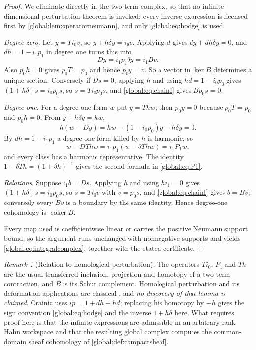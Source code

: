 \documentclass[11pt,letterpaper]{article}
\theoremstyle{definition}
\theoremstyle{remark}
\newtheorem{remark}[remark]{Remark}
\newcommand{\coker}{\operatorname{coker}}
\numberwithin{equation}{section}
\begin{document}
\begin{proof}
We eliminate directly in the two-term complex, so that no infinite-dimensional perturbation theorem is invoked; every inverse expression is licensed first by \cref{global:lem:operatorneumann}, and only \eqref{global:eq:hodge} is used.

\emph{Degree zero.} Let $y=Ti_0v$, so $y+h\delta y=i_0v$. Applying $d$ gives $dy+dh\delta y=0$, and $dh=1-i_1p_1$ in degree one turns this into
\begin{equation}\label{global:eq:chainI}
  Dy=i_1p_1\delta y=i_1Bv .
\end{equation}
Also $p_0h=0$ gives $p_0T=p_0$ and hence $p_0y=v$. So a vector in $\ker B$ determines a unique section. Conversely if $Ds=0$, applying $h$ and using $hd=1-i_0p_0$ gives $(1+h\delta)s=i_0p_0s$, so $s=Ti_0p_0s$, and \eqref{global:eq:chainI} gives $Bp_0s=0$.

\emph{Degree one.} For a degree-one form $w$ put $y=Thw$; then $p_0y=0$ because $p_0T=p_0$ and $p_0h=0$. From $y+h\delta y=hw$,
\[
  h(w-Dy)=hw-(1-i_0p_0)y-h\delta y=0 .
\]
By $dh=1-i_1p_1$ a degree-one form killed by $h$ is harmonic, so
\begin{equation}\label{global:eq:eliminate}
  w-DThw=i_1p_1(w-\delta Thw)=i_1P_1w,
\end{equation}
and every class has a harmonic representative. The identity $1-\delta Th=(1+\delta h)^{-1}$ gives the second formula in \eqref{global:eq:P1}.

\emph{Relations.} Suppose $i_1b=Ds$. Applying $h$ and using $hi_1=0$ gives $(1+h\delta)s=i_0p_0s$, so $s=Ti_0v$ with $v=p_0s$, and \eqref{global:eq:chainI} gives $b=Bv$; conversely every $Bv$ is a boundary by the same identity. Hence degree-one cohomology is $\coker B$.

Every map used is coefficientwise linear or carries the positive Neumann support bound, so the argument runs unchanged with nonnegative supports and yields \eqref{global:eq:integralcomplex}, together with the stated certificate.
\end{proof}

\begin{remark}[Relation to homological perturbation]\label{global:rem:perturbation}
The operators $Ti_0$, $P_1$ and $Th$ are the usual transferred inclusion, projection and homotopy of a two-term contraction, and $B$ is its Schur complement. Homological perturbation and its deformation applications are classical \cite[\S2, especially Lemma~2.4]{Crainic}\cite{GL}, and \emph{no discovery of that lemma is claimed}. Crainic uses $ip=1+dh+hd$; replacing his homotopy by $-h$ gives the sign convention \eqref{global:eq:hodge} and the inverse $1+h\delta$ here. What requires proof here is that the infinite expressions are admissible in an arbitrary-rank Hahn workspace and that the resulting global complex computes the common-domain sheaf cohomology of \cref{global:def:compactsheaf}.
\end{remark}
\end{document}
